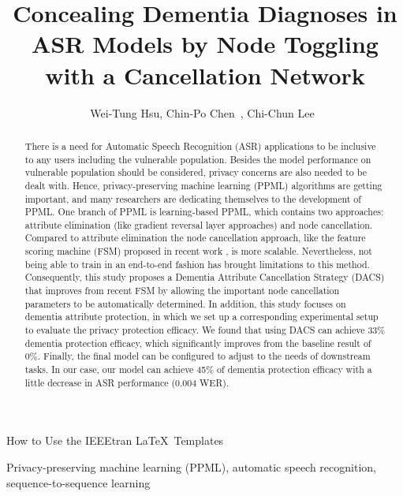 \documentclass[lettersize,journal]{IEEEtran}
\begin{document}
\title{Concealing Dementia Diagnoses in ASR Models by Node Toggling with a Cancellation Network}
\author{Wei-Tung Hsu, Chin-Po Chen~,  Chi-Chun Lee~}

%
{How to Use the IEEEtran \LaTeX \ Templates}

\maketitle

\begin{abstract}
There is a need for Automatic Speech Recognition (ASR) applications to be inclusive to any users including the  vulnerable population. Besides the model performance on vulnerable population should be considered, privacy concerns are also needed to be dealt with. Hence, privacy-preserving machine learning (PPML) algorithms are getting important, and many researchers are dedicating themselves to the development of PPML. One branch of PPML is learning-based PPML, which contains two approaches: attribute elimination (like gradient reversal layer approaches) and node cancellation. Compared to attribute elimination the node cancellation approach, like the feature scoring machine (FSM) proposed in recent work \cite{huang2022attention}, is more scalable. Nevertheless, not being able to train in an end-to-end fashion has brought limitations to this method. Consequently, this study proposes a Dementia Attribute Cancellation Strategy (DACS) that improves from recent FSM by allowing the important node cancellation parameters to be automatically determined. In addition, this study focuses on dementia attribute protection, in which we set up a corresponding experimental setup to evaluate the privacy protection efficacy. We found that using DACS can achieve 33\% dementia protection efficacy, which significantly improves from the baseline result of 0\%. Finally, the final model can be configured to adjust to the needs of downstream tasks. In our case, our model can achieve 45\% of dementia protection efficacy with a little decrease in ASR performance (0.004 WER).


\end{abstract}

\begin{IEEEkeywords}
Privacy-preserving machine learning (PPML), automatic speech recognition, sequence-to-sequence learning
\end{IEEEkeywords}
\end{document}
